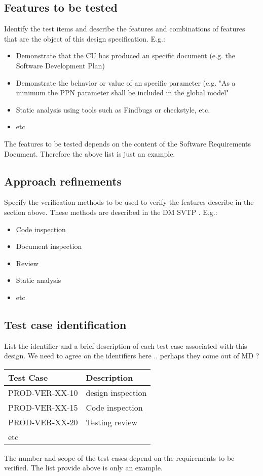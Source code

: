 \documentclass[DM,lsstdraft,STS,toc]{lsstdoc}
\def\product{PROD}
\begin{document}
\subsection{Features to be tested \label{sect:totest}}
Identify the test items and describe the features and combinations of features that are the object of this design
specification. E.g.:\\
\begin{itemize}
\item Demonstrate that the CU has produced an specific document (e.g. the Software Development Plan)
\item Demonstrate the behavior or value of an specific parameter (e.g. "As a minimum the PPN parameter shall be included in
the global model"
\item Static analysis using tools such as Findbugs or checkstyle, etc.
\item etc
\end{itemize}
The features to be tested depends on the content of the Software Requirements Document. Therefore the above list is just
an example.

\subsection{Approach refinements \label{sect:approach}}
Specify the verification methods to be used to verify the features describe in the section above. These methods are
described in the DM SVTP . E.g.:
\begin{itemize}
\item Code inspection
\item Document inspection
\item Review
\item Static analysis
\item etc
\end{itemize}

\subsection{Test case identification \label{sect:testcaselist}}
List the identifier and a brief description of each test case associated with this design.
We need to agree on the identifiers here .. perhaps they come out of MD ?

\begin{longtable} {|p{}|p{}|}\hline
{\bf Test Case}  & {\bf Description}  \\\hline
\product-VER-XX-10 & design inspection \\\hline
\product-VER-XX-15 & Code inspection \\\hline
\product-VER-XX-20 & Testing review \\\hline
etc & \\\hline
\end{longtable}
The number and scope of the test cases depend on the requirements to be verified. The list provide above is only an example.
\end{document}
